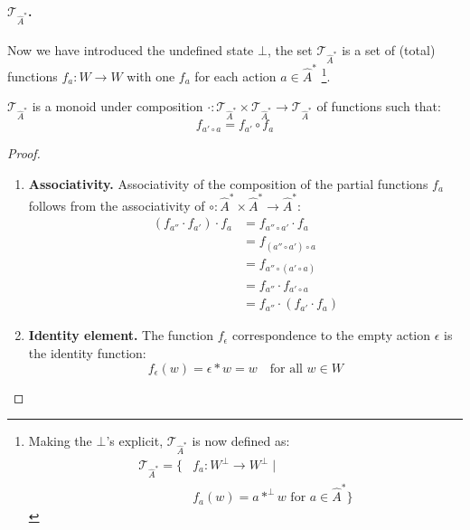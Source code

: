 \paragraph{$\mathcal{T}_{\hat{A}^{\ast}}$.}
Now we have introduced the undefined state $\bot$, the set $\mathcal{T}_{\hat{A}^{\ast}}$ is a set of (total) functions $f_{a}: W \to W$ with one $f_{a}$ for each action $a \in \hat{A}^{\ast}$ \footnote{
Making the $\bot$'s explicit, $\mathcal{T}_{\hat{A}^{\ast}}$ is now defined as:
\begin{equation}
\begin{aligned}
    \mathcal{T}_{\hat{A}^{\ast}} = \{&f_{a}: W^{\bot} \to W^{\bot} \mid \\
    & f_{a}(w) = a \ast^{\bot} w \text{ for $a \in \hat{A}^{\ast}$} \}
\end{aligned}
\end{equation}
}.

\begin{proposition}
    $\mathcal{T}_{\hat{A}^{\ast}}$ is a monoid under composition $\cdot: \mathcal{T}_{\hat{A}^{\ast}} \times \mathcal{T}_{\hat{A}^{\ast}} \to \mathcal{T}_{\hat{A}^{\ast}}$ of functions such that:
    \begin{equation}
        f_{a' \circ a} = f_{a'} \circ f_{a}
    \end{equation}
\end{proposition}
\begin{proof}
    \begin{enumerate}[(1)]
        \item \textbf{Associativity.}
        Associativity of the composition of the partial functions $f_{a}$ follows from the associativity of $\circ: \hat{A}^{\ast} \times \hat{A}^{\ast} \to \hat{A}^{\ast}$:
        \begin{align}
            (f_{a''} \cdot f_{a'}) \cdot f_{a}  &= f_{a'' \circ a'} \cdot f_{a} \\
                                                &= f_{(a'' \circ a') \circ a} \\
                                                &= f_{a'' \circ (a' \circ a)} \\
                                                &= f_{a''} \cdot f_{a' \circ a} \\
                                                &= f_{a''} \cdot (f_{a'} \cdot f_{a})
        \end{align}
        \item \textbf{Identity element.}
        The function $f_{\epsilon}$ correspondence to the empty action $\epsilon$ is the identity function:
        \begin{equation}
            f_{\epsilon}(w) = \epsilon \ast w = w \quad \text{for all $w \in W$}
        \end{equation}
    \end{enumerate}
\end{proof}

